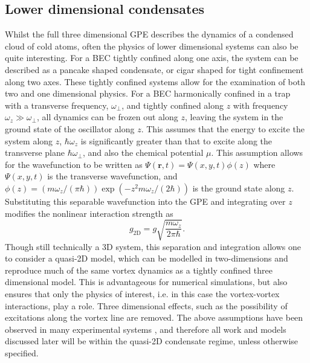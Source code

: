 \subsection{Lower dimensional condensates}\label{sub:coldatom_recent}
Whilst the full three dimensional GPE describes the dynamics of a condensed cloud of cold atoms, often the physics of lower dimensional systems can also be quite interesting. For a BEC tightly confined along one axis, the system can be described as a pancake shaped condensate, or cigar shaped for tight confinement along two axes. These tightly confined systems allow for the examination of both two and one dimensional physics. For a BEC harmonically confined in a trap with a transverse frequency, $\omega_\perp$, and tightly confined along $z$ with frequency $\omega_z \gg \omega_\perp$, all dynamics can be frozen out along $z$, leaving the system in the ground state of the oscillator along $z$. This assumes that the energy to excite the system along $z$, $\hbar\omega_z$ is significantly greater than that to excite along the transverse plane $\hbar\omega_\perp$, and also the chemical potential $\mu$. This assumption allows for the wavefunction to be written as $\Psi(\mathbf{r},t) = \Psi(x,y,t)\phi(z)$ where $\Psi(x,y,t)$ is the transverse wavefunction, and $\phi(z) = \left({m\omega_z/(\pi\hbar)}\right)\exp\left(-z^2{m\omega_z/(2\hbar)}\right)$ is the ground state along $z$.
Substituting this separable wavefunction into the GPE and integrating over $z$ modifies the nonlinear interaction strength as~\cite{BK:Pethick_Smith_2008}
\begin{equation}\label{eqn:g2d_efint}
    g_{\textrm{2D}} = g\sqrt{\frac{m\omega_z}{2\pi\hbar}}.
\end{equation}
Though still technically a 3D system, this separation and integration allows one to consider a quasi-2D model, which can be modelled in two-dimensions and reproduce much of the same vortex dynamics as a tightly confined three dimensional model. This is advantageous for numerical simulations, but also ensures that only the physics of interest, i.e. in this case the vortex-vortex interactions, play a role. Three dimensional effects, such as the possibility of excitations along the vortex line are removed. The above assumptions have been observed in many experimental systems \cite{BEC:Gorlitz_prl_2001,BEC:Stock_prl_2005,Vtx:Neely_prl_2010,VTX:Kwon_pra_2014,BEC:Seo_jkps_2014,BEC:Chomaz_natcom_2015}, and therefore all work and models discussed later will be within the quasi-2D condensate regime, unless otherwise specified.
